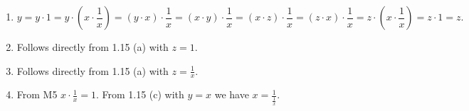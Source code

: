 \begin{solution}
\begin{enumerate}[label=(\alph*)]
\item \[y = y \cdot 1 = y \cdot (x \cdot \frac{1}{x}) = (y \cdot x) \cdot \frac{1}{x} = (x \cdot y) \cdot \frac{1}{x} = (x \cdot z) \cdot \frac{1}{x} = (z \cdot x) \cdot \frac{1}{x} = z \cdot (x \cdot \frac{1}{x}) = z \cdot 1 = z.\]
\item Follows directly from 1.15 (a) with $z = 1$.
\item Follows directly from 1.15 (a) with $z = \frac{1}{x}$.
\item From M5 $x \cdot \frac{1}{x} = 1$. From 1.15 (c) with $y = x$ we have $x = \frac{1}{\frac{1}{x}}$.
\end{enumerate}
\end{solution}

